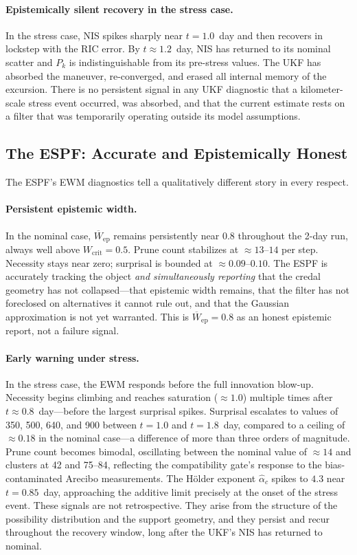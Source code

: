 \documentclass[12pt]{article}
\begin{document}
\paragraph{Epistemically silent recovery in the stress case.}
In the stress case, NIS spikes sharply near $t=1.0$~day and then
recovers in lockstep with the RIC error.
By $t\approx 1.2$~day, NIS has returned to its nominal scatter and $P_k$
is indistinguishable from its pre-stress values.
The UKF has absorbed the maneuver, re-converged, and erased all internal
memory of the excursion.
There is no persistent signal in any UKF diagnostic that a kilometer-scale
stress event occurred, was absorbed, and that the current estimate rests on
a filter that was temporarily operating outside its model assumptions.

\subsection{The ESPF: Accurate and Epistemically Honest}

The ESPF's EWM diagnostics tell a qualitatively different story in every
respect.

\paragraph{Persistent epistemic width.}
In the nominal case, $\overline{W}_\mathrm{ep}$ remains persistently near
$0.8$ throughout the 2-day run, always well above $W_\mathrm{crit}=0.5$.
Prune count stabilizes at $\approx 13$--$14$ per step.
Necessity stays near zero; surprisal is bounded at $\approx 0.09$--$0.10$.
The ESPF is accurately tracking the object \emph{and simultaneously
reporting} that the credal geometry has not collapsed---that epistemic
width remains, that the filter has not foreclosed on alternatives it cannot
rule out, and that the Gaussian approximation is not yet warranted.
This is $\overline{W}_\mathrm{ep}=0.8$ as an honest epistemic report,
not a failure signal.

\paragraph{Early warning under stress.}
In the stress case, the EWM responds before the full innovation blow-up.
Necessity begins climbing and reaches saturation ($\approx 1.0$) multiple
times after $t\approx 0.8$~day---before the largest surprisal spikes.
Surprisal escalates to values of 350, 500, 640, and 900 between
$t=1.0$ and $t=1.8$~day, compared to a ceiling of $\approx 0.18$ in the
nominal case---a difference of more than three orders of magnitude.
Prune count becomes bimodal, oscillating between the nominal value of
$\approx 14$ and clusters at 42 and 75--84, reflecting the compatibility
gate's response to the bias-contaminated Arecibo measurements.
The H\"{o}lder exponent $\hat\alpha_c$ spikes to $4.3$ near $t=0.85$~day,
approaching the additive limit precisely at the onset of the stress event.
These signals are not retrospective.
They arise from the structure of the possibility distribution and the
support geometry, and they persist and recur throughout the recovery window,
long after the UKF's NIS has returned to nominal.
\end{document}
